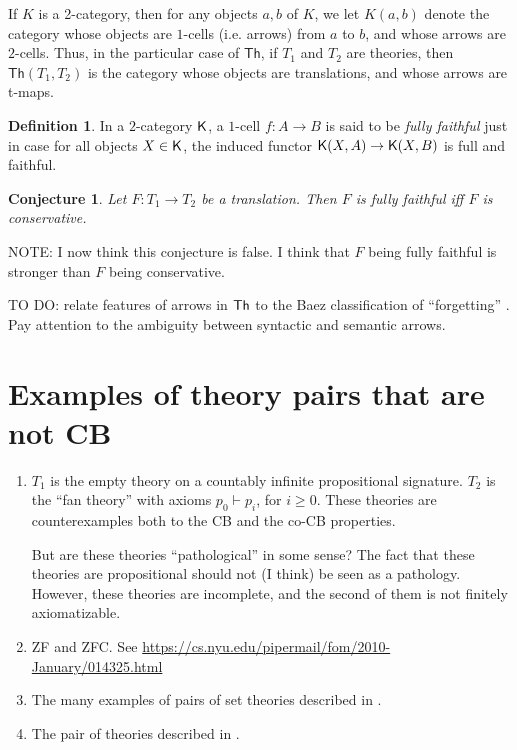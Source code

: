 \documentclass[12pt]{article}
\newtheorem{conj}[prop]{Conjecture}
\theoremstyle{definition}
\newtheorem*{defn}{Definition}
\theoremstyle{remark}
\newcommand{\3}{\mathcal}
\begin{document}
If $K$ is a 2-category, then for any objects $a,b$ of $K$, we let
$K(a,b)$ denote the category whose objects are $1$-cells (i.e. arrows)
from $a$ to $b$, and whose arrows are $2$-cells. Thus, in the
particular case of $\mathsf{Th}$, if $T_1$ and $T_2$ are theories,
then $\mathsf{Th}(T_1,T_2)$ is the category whose objects are
translations, and whose arrows are t-maps.

\begin{defn} In a $2$-category $\mathsf K$, a $1$-cell $f:A\to B$ is said to
  be \emph{fully faithful} just in case for all objects $X\in \mathsf K$,
  the induced functor $\mathsf K (X,A)\to \mathsf K (X,B)$ is full and
  faithful. \end{defn}

\begin{conj} Let $F:T_1\to T_2$ be a translation. Then $F$ is fully
  faithful iff $F$ is conservative. \end{conj}

NOTE: I now think this conjecture is false. I think that $F$ being
fully faithful is stronger than $F$ being conservative.

\bigskip TO DO: relate features of arrows in $\mathsf{Th}$ to the Baez
classification of ``forgetting''
\citep{forget,weatherall2016,barrett2020}. Pay attention to the
ambiguity between syntactic and semantic arrows.

\section{Examples of theory pairs that are not CB}


\begin{enumerate}
\item $T_1$ is the empty theory on a countably infinite propositional
  signature. $T_2$ is the ``fan theory'' with axioms $p_0\vdash p_i$,
  for $i\geq 0$. These theories are counterexamples both to the CB and
  the co-CB properties.

  But are these theories ``pathological'' in some sense? The fact that
  these theories are propositional should not (I think) be seen as a
  pathology. However, these theories are incomplete, and the second of
  them is not finitely axiomatizable.
\item ZF and ZFC. See
  \url{https://cs.nyu.edu/pipermail/fom/2010-January/014325.html}
\item The many examples of pairs of set theories described in \citep[p
  8]{hamkins}.
\item The pair of theories described in \citep{andreka}.
\end{enumerate}
\end{document}

